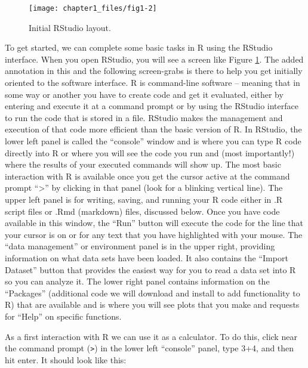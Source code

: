 \documentclass[
]{book}
\begin{document}
\begin{figure}[ht!]

{\centering \texttt{[image: chapter1\_files/fig1-2]} 

}

\caption{Initial RStudio layout.}\label{fig:Figure1-2}
\end{figure}

\newpage

\indent To get started, we can complete some basic tasks in R using the RStudio
interface. When you open RStudio, you will see a screen like Figure
\ref{fig:Figure1-2}. The
added annotation in this and the following screen-grabs is there to help you
get initially oriented to the software interface. R is command-line software --
meaning that in some way or another you have to create code and get it evaluated,
either by entering and execute it at a command prompt or by using the RStudio
interface to run the code that is stored in a file. RStudio makes the management and
execution of that code more efficient than the basic version of R. In RStudio,
the lower left panel is called the ``console'' window and is where you can type R
code directly into R or where you will see the code you run and (most
importantly!) where the results of your executed commands will show up. The
most basic interaction with R is available once you get the cursor active at
the command prompt ``\textgreater{}'' by clicking in that panel (look for a blinking
vertical line). The upper left panel is for writing, saving, and running your R
code either in .R script files or .Rmd (markdown) files, discussed below. Once
you have code available in this window, the ``Run'' button will
execute the code for the line that your cursor is on or for any text that you
have highlighted with your mouse. The ``data management'' or environment panel is
in the upper right, providing information on what data sets have been loaded.
It also contains the ``Import Dataset'' button that provides the easiest way for
you to read a data set into R so you can analyze it. The lower right panel
contains information on the ``Packages'' (additional code we will download and
install to add functionality to R) that are available and is where you will see
plots that you make and requests for ``Help'' on specific functions.

\indent As a first interaction with R we can use it as a calculator. To do this, click near the command prompt
(\texttt{\textgreater{}}) in the lower left ``console'' panel, type 3+4, and then hit enter. It
should look like this:
\end{document}
